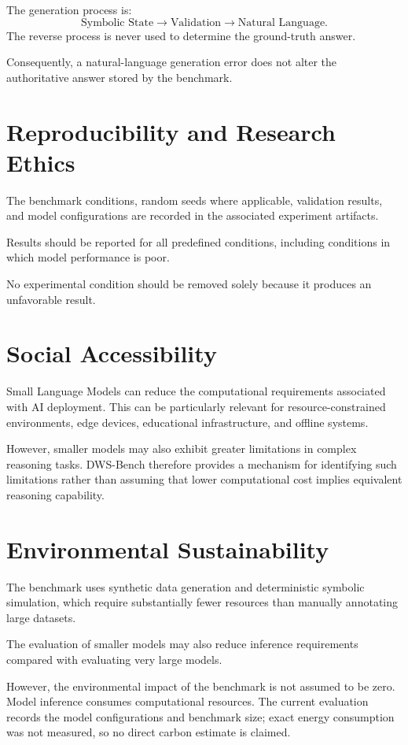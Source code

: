 \documentclass{iutbscthesis}
\begin{document}
The generation process is:
\[
\text{Symbolic State}
\rightarrow
\text{Validation}
\rightarrow
\text{Natural Language}.
\]
The reverse process is never used to determine the ground-truth answer.

Consequently, a natural-language generation error does not alter the authoritative answer stored by the
benchmark.

\section{Reproducibility and Research Ethics}
The benchmark conditions, random seeds where applicable, validation results, and model configurations
are recorded in the associated experiment artifacts.

Results should be reported for all predefined conditions, including conditions in which model
performance is poor.

No experimental condition should be removed solely because it produces an unfavorable result.

\section{Social Accessibility}
Small Language Models can reduce the computational requirements associated with AI deployment.
This can be particularly relevant for resource-constrained environments, edge devices, educational
infrastructure, and offline systems.

However, smaller models may also exhibit greater limitations in complex reasoning tasks. DWS-Bench
therefore provides a mechanism for identifying such limitations rather than assuming that lower
computational cost implies equivalent reasoning capability.

\section{Environmental Sustainability}
The benchmark uses synthetic data generation and deterministic symbolic simulation, which require
substantially fewer resources than manually annotating large datasets.

The evaluation of smaller models may also reduce inference requirements compared with evaluating
very large models.

However, the environmental impact of the benchmark is not assumed to be zero. Model inference
consumes computational resources. The current evaluation records the model configurations and
benchmark size; exact energy consumption was not measured, so no direct carbon estimate is claimed.
\end{document}
